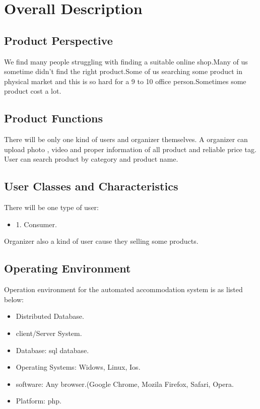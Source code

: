 \documentclass{article}
\begin{document}
\section{Overall Description}
\subsection{Product Perspective}
We find many people struggling with finding a suitable online shop.Many of us sometime didn't find the right product.Some of us searching some product in physical market and this is so hard for a 9 to 10 office person.Sometimes some product cost a lot.
\subsection{Product Functions}
There will be only one kind of users and organizer themselves. A organizer can upload photo , video and proper information of all product and reliable price tag. User can search product by category and product name.
\subsection{User Classes and Characteristics}
There will be one type of user:
\begin{itemize}
\item 1. Consumer.
\end{itemize}
Organizer also a kind of user cause they selling some products.
\subsection{Operating Environment}
Operation environment for the automated accommodation system is as listed below:
\begin{itemize}
\item Distributed Database.
\item client/Server System.
\item Database: sql database.
\item Operating Systems: Widows, Linux, Ios.
\item software: Any browser.(Google Chrome, Mozila Firefox, Safari, Opera.
\item Platform: php.
\end{itemize}
\end{document}
